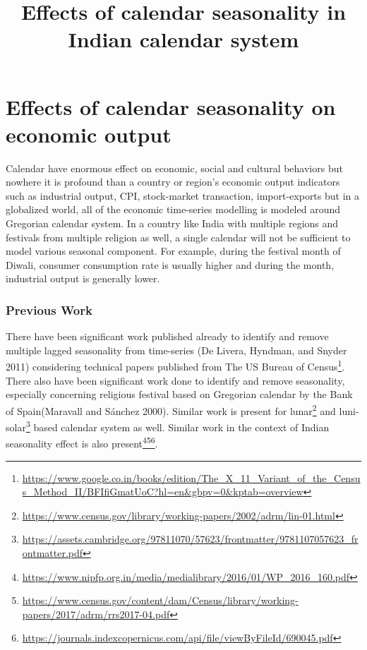 \documentclass[
]{article}
\title{Effects of calendar seasonality in Indian calendar system}
\author{}
\date{\vspace{-2.5em}}
\begin{document}
\maketitle

\hypertarget{effects-of-calendar-seasonality-on-economic-output}{%
\section{Effects of calendar seasonality on economic
output}\label{effects-of-calendar-seasonality-on-economic-output}}

Calendar have enormous effect on economic, social and cultural behaviors
but nowhere it is profound than a country or region's economic output
indicators such as industrial output, CPI, stock-market transaction,
import-exports but in a globalized world, all of the economic
time-series modelling is modeled around Gregorian calendar system. In a
country like India with multiple regions and festivals from multiple
religion as well, a single calendar will not be sufficient to model
various seasonal component. For example, during the festival month of
Diwali, consumer consumption rate is usually higher and during the
month, industrial output is generally lower.

\hypertarget{previous-work}{%
\subsubsection{Previous Work}\label{previous-work}}

There have been significant work published already to identify and
remove multiple lagged seasonality from time-series (De Livera, Hyndman,
and Snyder 2011) considering technical papers published from The US
Bureau of Census\footnote{\url{https://www.google.co.in/books/edition/The_X_11_Variant_of_the_Census_Method_II/BFIfiGmatUoC?hl=en\&gbpv=0\&kptab=overview}}.
There also have been significant work done to identify and remove
seasonality, especially concerning religious festival based on Gregorian
calendar by the Bank of Spain(Maravall and Sánchez 2000). Similar work
is present for lunar\footnote{\url{https://www.census.gov/library/working-papers/2002/adrm/lin-01.html}}
and luni-solar\footnote{\url{https://assets.cambridge.org/97811070/57623/frontmatter/9781107057623_frontmatter.pdf}}
based calendar system as well. Similar work in the context of Indian
seasonality effect is also present\footnote{\url{https://www.nipfp.org.in/media/medialibrary/2016/01/WP_2016_160.pdf}}\footnote{\url{https://www.census.gov/content/dam/Census/library/working-papers/2017/adrm/rrs2017-04.pdf}}\footnote{\url{https://journals.indexcopernicus.com/api/file/viewByFileId/690045.pdf}}.
\end{document}
